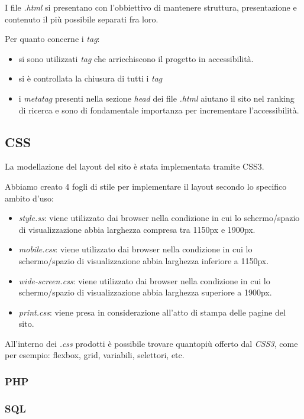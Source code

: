 \documentclass[]{article}
\begin{document}
I file \textit{.html} si presentano con l'obbiettivo di mantenere struttura, presentazione e contenuto il più possibile separati fra loro.

Per quanto concerne i \textit{tag}:
\begin{itemize}
	\item si sono utilizzati \textit{tag} che arricchiscono il progetto in accessibilità.
	\item si è controllata la chiusura di tutti i \textit{tag}
	\item i \textit{metatag} presenti nella sezione \textit{head} dei file \textit{.html} aiutano il sito nel ranking di ricerca e sono di fondamentale importanza per incrementare l'accessibilità.
\end{itemize}

\subsection{CSS}
La modellazione del layout del sito è stata implementata tramite CSS3.

Abbiamo creato 4 fogli di stile per implementare il layout secondo lo specifico ambito d'uso:
\begin{itemize}
	\item \textit{style.ss}: viene utilizzato dai browser nella condizione in cui lo schermo/spazio di visualizzazione abbia larghezza compresa tra 1150px e 1900px.
	\item \textit{mobile.css}: viene utilizzato dai browser nella condizione in cui lo schermo/spazio di visualizzazione abbia larghezza inferiore a 1150px.
	\item \textit{wide-screen.css}: viene utilizzato dai browser nella condizione in cui lo schermo/spazio di visualizzazione abbia larghezza superiore a 1900px.
	\item \textit{print.css}: viene presa in considerazione all'atto di stampa delle pagine del sito.
\end{itemize}

All'interno dei \textit{.css} prodotti è possibile trovare quantopiù offerto dal \textit{CSS3}, come per esempio: flexbox, grid, variabili, selettori, etc.





\subsubsection{PHP} %
\subsubsection{SQL}	%
\end{document}
